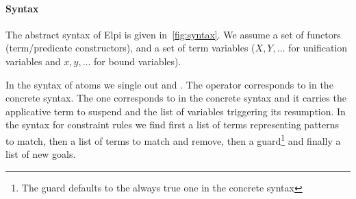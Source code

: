 \documentclass{these-ISSS}
\begin{document}
\paragraph{Syntax}
The abstract syntax of Elpi is given in~\cref{fig:syntax}.
We assume a set \PRED of functors (term/predicate constructors), and a set \VAR of term variables
($X,Y,\ldots$ for unification variables and $x,y,\ldots$ for bound variables).

In the syntax of atoms \ATOM we single out \cut and \cst.
The \cut operator corresponds to \elpi{!} in the concrete syntax.
The \cst one corresponds to  in the concrete syntax
and it carries the applicative term to suspend and the list of variables triggering
its resumption.
In the syntax for constraint rules \CHR we find first a list of
terms representing patterns to match, then a list of terms to match and remove,
then a guard\footnote{The guard defaults to the always true one in the concrete syntax}
and finally a list of new goals.




\end{document}
